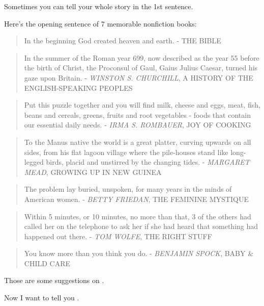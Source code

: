 \documentclass{book}
\numberwithin{equation}{section}
\begin{document}
Sometimes you can tell your whole story in the 1st sentence.

Here's the opening sentence of 7 memorable nonfiction books:

\begin{quotation}
    In the beginning God created heaven and earth. - THE BIBLE
\end{quotation}

\begin{quotation}
    In the summer of the Roman year 699, now described as the year 55 before the birth of Christ, the Proconsul of Gaul, Gaius Julius Caesar, turned his gaze upon Britain. - \textit{WINSTON S. CHURCHILL}, A HISTORY OF THE ENGLISH-SPEAKING PEOPLES
\end{quotation}

\begin{quotation}
    Put this puzzle together and you will find milk, cheese and eggs, meat, fish, beans and cereals, greens, fruits and root vegetables - foods that contain our essential daily needs. - \textit{IRMA S. ROMBAUER}, JOY OF COOKING
\end{quotation}

\begin{quotation}
    To the Manus native the world is a great platter, curving upwards on all sides, from his flat lagoon village where the pile-houses stand like long-legged birds, placid and unstirred by the changing tides. - \textit{MARGARET MEAD}, GROWING UP IN NEW GUINEA
\end{quotation}

\begin{quotation}
    The problem lay buried, unspoken, for many years in the minds of American women. - \textit{BETTY FRIEDAN}, THE FEMININE MYSTIQUE
\end{quotation}

\begin{quotation}
    Within 5 minutes, or 10 minutes, no more than that, 3 of the others had called her on the telephone to ask her if she had heard that something had happened out there. - \textit{TOM WOLFE}, THE RIGHT STUFF
\end{quotation}

\begin{quotation}
    You know more than you think you do. - \textit{BENJAMIN SPOCK}, BABY \& CHILD CARE
\end{quotation}
Those are some suggestions on .

Now I want to tell you .
\end{document}
